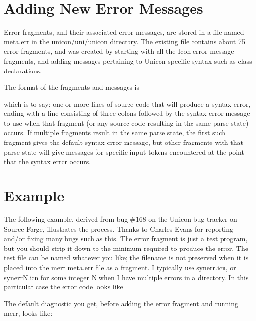 \documentclass[letterpaper]{article}
\begin{document}
\section{Adding New Error Messages}

Error fragments, and their associated error messages, are stored in a
file named meta.err in the unicon/uni/unicon directory.  The existing
file contains about 75 error fragments, and was created by starting
with all the Icon error message fragments, and adding messages
pertaining to Unicon-specific syntax such as class declarations.

The format of the fragments and messages is


\noindent which is to say: one or more lines of source code that will
produce a syntax error, ending with a line consisting of three colons
followed by the syntax error message to use when that fragment (or any
source code resulting in the same parse state) occurs.  If multiple
fragments result in the same parse state, the first such fragment
gives the default syntax error message, but other fragments with that
parse state will give messages for specific input tokens encountered
at the point that the syntax error occurs.

\section{Example}

The following example, derived from bug \#168 on the Unicon bug
tracker on Source Forge, illustrates the process. Thanks to Charles
Evans for reporting and/or fixing many bugs such as this.  The error
fragment is just a test program, but you should strip it down to the
minimum required to produce the error. The test file can be named
whatever you like; the filename is not preserved when it is placed
into the merr meta.err file as a fragment. I typically use synerr.icn,
or synerrN.icn for some integer N when I have multiple errors in a
directory.  In this particular case the error code looks like


\noindent The default diagnostic you get, before adding the error fragment
and running merr, looks like:

\end{document}
